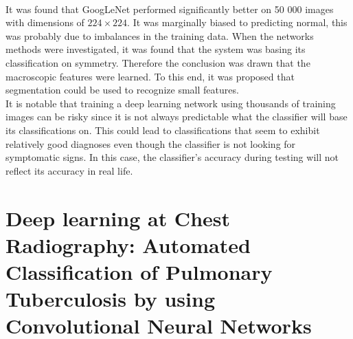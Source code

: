 \\
It was found that GoogLeNet performed significantly better on 50 000 images with dimensions of $224\times224$. It was marginally biased to predicting normal, this was probably due to imbalances in the training data. When the networks methods were investigated, it was found that the system was basing its classification on symmetry. Therefore the conclusion was drawn that the macroscopic features were learned. To this end, it was proposed that segmentation could be used to recognize small features.\newline
\\
It is notable that training a deep learning network using thousands of training images can be risky since it is not always predictable what the classifier will base its classifications on. This could lead to classifications that seem to exhibit relatively good diagnoses even though the classifier is not looking for symptomatic signs. In this case, the classifier's accuracy during testing will not reflect its accuracy in real life.

\newpage
\section{Deep learning at Chest Radiography: Automated Classification  of Pulmonary Tuberculosis by using Convolutional Neural Networks \cite{3}}

